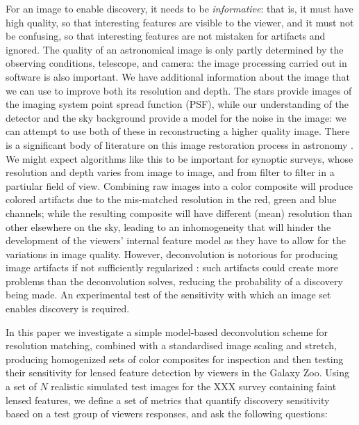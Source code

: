 \documentclass[letterpaper, 11pt]{article}
\begin{document}
For an image to enable discovery, it needs to be {\it informative}: that is,
it must have high quality, so that interesting features are visible to the
viewer, and it must not be confusing, so that interesting features are not
mistaken for artifacts and ignored. The quality of an astronomical image is
only partly determined by the observing conditions, telescope, and camera: the
image processing carried out in software is also important. We have additional
information about the image that we can use to improve both its resolution and
depth. The stars provide images of the imaging system point spread function
(PSF), while our understanding of the detector and the sky background provide
a model for the noise in the image: we can attempt to use both of these in
reconstructing a higher quality image. There is a significant body of
literature on this image restoration process in astronomy \citep[e.g.][]{Ric72, N+N82, S+B84, P+P93, MCS98}. We might
expect algorithms like this to be important for synoptic surveys, whose
resolution and depth varies from image to image, and from filter to filter in
a partiular field of view. Combining raw images into a color composite will
produce colored artifacts due to the mis-matched resolution in the red, green
and blue channels; while the resulting composite will have different (mean)
resolution than other elsewhere on the sky, leading to an inhomogeneity that
will hinder the development of the viewers' internal feature model as they
have to allow for the variations in image quality. However, deconvolution is
notorious for producing image artifacts if not sufficiently regularized
\citep[see, for example, comments at the end of section~1 of][]{MCS98}: such artifacts could
create more problems than the deconvolution solves, reducing the probability
of a discovery being made.  An experimental test of the sensitivity with which
an image set enables discovery is required.

In this paper we investigate a simple model-based deconvolution scheme for
resolution matching, combined with a standardised image scaling and stretch,
producing homogenized sets of color composites for inspection and then testing
their sensitivity for lensed feature detection by viewers in the Galaxy Zoo.
Using a set of $N$ realistic simulated test images for the XXX survey 
containing faint lensed features, we define a set of metrics that quantify
discovery sensitivity based on a test group of viewers responses, and 
ask the following questions:
\end{document}
